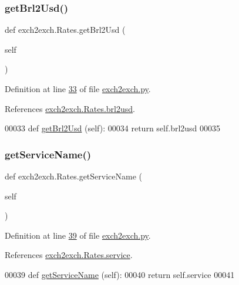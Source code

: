 \subsubsection{\texorpdfstring{get\+Brl2\+Usd()}{getBrl2Usd()}}
{\footnotesize\ttfamily def exch2exch.\+Rates.\+get\+Brl2\+Usd (\begin{DoxyParamCaption}\item[{}]{self }\end{DoxyParamCaption})}



Definition at line \hyperlink{exch2exch_8py_source_l00033}{33} of file \hyperlink{exch2exch_8py_source}{exch2exch.\+py}.



References \hyperlink{exch2exch_8py_source_l00030}{exch2exch.\+Rates.\+brl2usd}.


\begin{DoxyCode}
00033     \textcolor{keyword}{def }\hyperlink{namespacerates_a083f2cdcd71554d301bcbfb0779ffa49}{getBrl2Usd} (self):
00034         \textcolor{keywordflow}{return} self.brl2usd
00035     
\end{DoxyCode}
\mbox{\label{classexch2exch_1_1_rates_a41aec7438ab7b0c8ba17bc3502ee335e}} 
\subsubsection{\texorpdfstring{get\+Service\+Name()}{getServiceName()}}
{\footnotesize\ttfamily def exch2exch.\+Rates.\+get\+Service\+Name (\begin{DoxyParamCaption}\item[{}]{self }\end{DoxyParamCaption})}



Definition at line \hyperlink{exch2exch_8py_source_l00039}{39} of file \hyperlink{exch2exch_8py_source}{exch2exch.\+py}.



References \hyperlink{exch2exch_8py_source_l00031}{exch2exch.\+Rates.\+service}.


\begin{DoxyCode}
00039     \textcolor{keyword}{def }\hyperlink{namespacerates_a5dd7b6601bc66e313c26984e32f1e290}{getServiceName} (self):
00040         \textcolor{keywordflow}{return} self.service
00041         
\end{DoxyCode}
\mbox{\label{classexch2exch_1_1_rates_af5f9e36738bb2288ac39a8bca48b4282}} 

